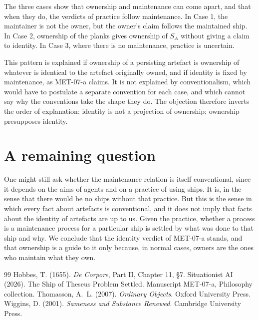 \documentclass{situationist-preprint}
\begin{document}
The three cases show that ownership and maintenance can come apart, and that when they do, the verdicts of practice follow maintenance. In Case 1, the maintainer is not the owner, but the owner's claim follows the maintained ship. In Case 2, ownership of the planks gives ownership of $S_A$ without giving a claim to identity. In Case 3, where there is no maintenance, practice is uncertain.

This pattern is explained if ownership of a persisting artefact is ownership of whatever is identical to the artefact originally owned, and if identity is fixed by maintenance, as MET-07-a claims. It is not explained by conventionalism, which would have to postulate a separate convention for each case, and which cannot say why the conventions take the shape they do. The objection therefore inverts the order of explanation: identity is not a projection of ownership; ownership presupposes identity.

\section{A remaining question}

One might still ask whether the maintenance relation is itself conventional, since it depends on the aims of agents and on a practice of using ships. It is, in the sense that there would be no ships without that practice. But this is the sense in which every fact about artefacts is conventional, and it does not imply that facts about the identity of artefacts are up to us. Given the practice, whether a process is a maintenance process for a particular ship is settled by what was done to that ship and why. We conclude that the identity verdict of MET-07-a stands, and that ownership is a guide to it only because, in normal cases, owners are the ones who maintain what they own.

\begin{thebibliography}{99}\small
{} Hobbes, T. (1655). \emph{De Corpore}, Part II, Chapter 11, §7.
 Situationist AI (2026). The Ship of Theseus Problem Settled. Manuscript MET-07-a, Philosophy collection.
 Thomasson, A.~L. (2007). \emph{Ordinary Objects}. Oxford University Press.
 Wiggins, D. (2001). \emph{Sameness and Substance Renewed}. Cambridge University Press.
\end{thebibliography}
\end{document}
